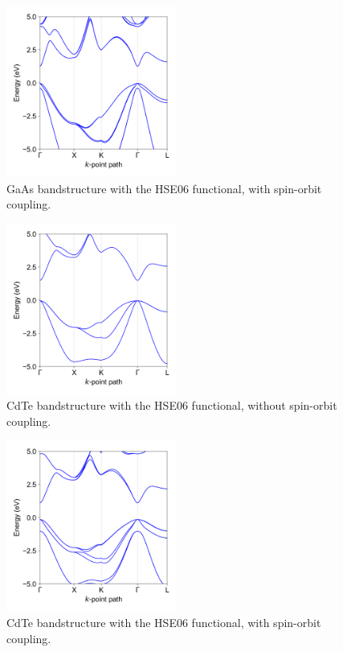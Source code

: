 \begin{figure}[htb]
\includegraphics[width=0.5\textwidth]{./figures/ap2/GaAs_hybrid_SoC.png}
\caption[GaAs bandstructure, HSE06, SoC]{GaAs bandstructure with the HSE06 functional, with spin-orbit coupling. }
\end{figure}

\clearpage

\begin{figure}[htb]
\includegraphics[width=0.5\textwidth]{./figures/ap2/CdTe_hybrid.png}
\caption[CdTe bandstructure, HSE06, no-SoC]{CdTe bandstructure with the HSE06 functional, without spin-orbit coupling. }
\end{figure}

\begin{figure}[htb]
\includegraphics[width=0.5\textwidth]{./figures/ap2/CdTe_hybrid_SoC.png}
\caption[CdTe bandstructure, HSE06, SoC]{CdTe bandstructure with the HSE06 functional, with spin-orbit coupling. }
\end{figure}
